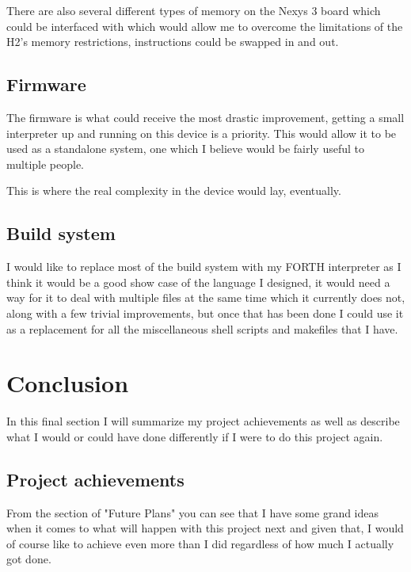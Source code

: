 \documentclass	[a4paper, 10pt]	{article}
\begin{document}
      There are also several different types of memory on the Nexys 3 board
      which could be interfaced with which would allow me to overcome the
      limitations of the H2's memory restrictions, instructions could be swapped
      in and out.

    \subsection{Firmware}

    The firmware is what could receive the most drastic improvement, getting a small
    interpreter up and running on this device is a priority. This would allow it
    to be used as a standalone system, one which I believe would be fairly useful
    to multiple people. 

    This is where the real complexity in the device would lay, eventually.

    \subsection{Build system}

    I would like to replace most of the build system with my FORTH interpreter as I
    think it would be a good show case of the language I designed, it would need
    a way for it to deal with multiple files at the same time which it currently does
    not, along with a few trivial improvements, but once that has been done I could
    use it as a replacement for all the miscellaneous shell scripts and makefiles
    that I have.

  \section{Conclusion}

    In this final section I will summarize my project achievements as well as describe
    what I would or could have done differently if I were to do this project again.

    \subsection{Project achievements}

    From the section of "Future Plans" you can see that I have some grand ideas when
    it comes to what will happen with this project next and given that, I would of course
    like to achieve even more than I did regardless of how much I actually got done.
\end{document}
